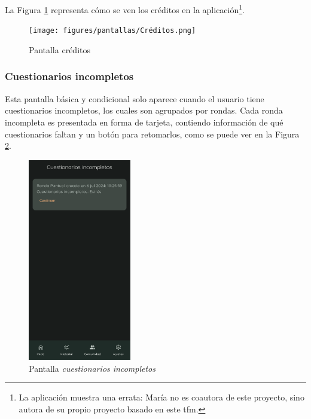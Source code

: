                 La Figura \ref{figure:implementacion:pantalla:creditos} representa cómo se ven los créditos en la aplicación\footnote{La aplicación muestra una errata: María no es coautora de este proyecto, sino autora de su propio proyecto basado en este \gls{tfm}.}.
                
                \begin{figure}[h]
                	\centering
                	\texttt{[image: figures/pantallas/Créditos.png]}
                	\caption{Pantalla créditos}
                	\label{figure:implementacion:pantalla:creditos}
                \end{figure}

                \clearpage  %
            \subsubsection*{Cuestionarios incompletos}
                Esta pantalla básica y condicional solo aparece cuando el usuario tiene cuestionarios incompletos, los cuales son agrupados por rondas. Cada ronda incompleta es presentada en forma de tarjeta, contiendo información de qué cuestionarios faltan y un botón para retomarlos, como se puede ver en la Figura \ref{figure:implementacion:pantalla:cuestionarios_incompletos}.
                
                \begin{figure}[h]
                	\centering
                	\includegraphics[width=0.4\textwidth]{figures/pantallas/Cuestionarios pendientes.png}
                	\caption{Pantalla \textit{cuestionarios incompletos}}
                	\label{figure:implementacion:pantalla:cuestionarios_incompletos}
                \end{figure}

